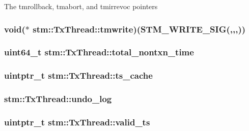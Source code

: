The tmrollback, tmabort, and tmirrevoc pointers \hypertarget{structstm_1_1TxThread_ac250db343a00b5b76d56202e2d95ab84}{
\subsubsection[{tmwrite}]{ void($\ast$ stm\-::\-Tx\-Thread\-::tmwrite)({\bf S\-T\-M\-\_\-\-W\-R\-I\-T\-E\-\_\-\-S\-I\-G}(,,,))}}\label{structstm_1_1TxThread_ac250db343a00b5b76d56202e2d95ab84}
\hypertarget{structstm_1_1TxThread_ad217a99774ad79e3d581b008ef067991}{
\subsubsection[{total\-\_\-nontxn\-\_\-time}]{\setlength{\rightskip}{0pt plus 5cm}uint64\-\_\-t stm\-::\-Tx\-Thread\-::total\-\_\-nontxn\-\_\-time}}\label{structstm_1_1TxThread_ad217a99774ad79e3d581b008ef067991}
\hypertarget{structstm_1_1TxThread_aa2a246af5aece9c002ca5968505a9d6f}{
\subsubsection[{ts\-\_\-cache}]{\setlength{\rightskip}{0pt plus 5cm}uintptr\-\_\-t stm\-::\-Tx\-Thread\-::ts\-\_\-cache}}\label{structstm_1_1TxThread_aa2a246af5aece9c002ca5968505a9d6f}
\hypertarget{structstm_1_1TxThread_afddcc03d014798b970c8a18f5c94588d}{
\subsubsection[{undo\-\_\-log}]{ stm\-::\-Tx\-Thread\-::undo\-\_\-log}}\label{structstm_1_1TxThread_afddcc03d014798b970c8a18f5c94588d}
\hypertarget{structstm_1_1TxThread_a9a38bf30ab011a2ae45c14ae3cfa6c97}{
\subsubsection[{valid\-\_\-ts}]{\setlength{\rightskip}{0pt plus 5cm}uintptr\-\_\-t stm\-::\-Tx\-Thread\-::valid\-\_\-ts}}\label{structstm_1_1TxThread_a9a38bf30ab011a2ae45c14ae3cfa6c97}
